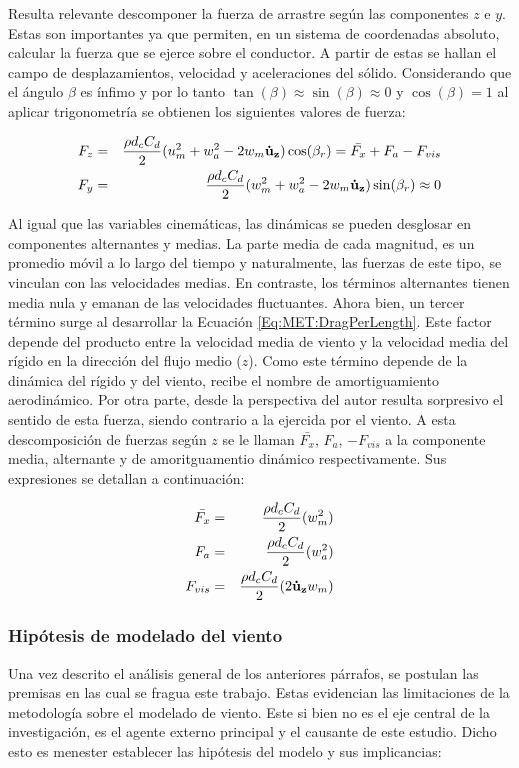 Resulta relevante descomponer la fuerza de arrastre según las componentes $z$ e $y$. Estas son importantes ya que permiten, en un sistema de coordenadas absoluto, calcular la fuerza que se ejerce sobre el conductor. A partir de estas se hallan el campo de desplazamientos, velocidad y aceleraciones del sólido. Considerando que el ángulo $\beta$ es ínfimo y por lo tanto $\tan(\beta)\approx\sin(\beta)\approx 0$ y $\cos(\beta)=1$ al aplicar trigonometría se obtienen los siguientes valores de fuerza:

\begin{eqnarray}
	F_z &=& \frac{\rho d_c C_d}{2} (u_m^2+w_a^2-2 w_m \text{$\bf{\dot{u}}_{z}$})\cos(\beta_r)=\bar{F_x}+F_a-F_{vis}\\
	F_y &=& \frac{\rho d_c C_d}{2} (w_m^2+w_a^2-2 w_m \text{$\bf{\dot{u}}_{z}$})\sin(\beta_r)\approx 0
\end{eqnarray}

Al igual que las variables cinemáticas, las dinámicas se pueden desglosar en componentes alternantes y medias. La parte media de cada magnitud, es un promedio móvil a lo largo del tiempo y naturalmente, las fuerzas de este tipo, se vinculan con las velocidades medias. En contraste, los términos alternantes tienen media nula y emanan de las velocidades fluctuantes. Ahora bien, un tercer término surge al desarrollar la Ecuación \eqref{Eq:MET:DragPerLength}. Este factor depende del producto entre la velocidad media de viento y la velocidad media del rígido en la dirección del flujo medio ($z$). Como este término depende de la dinámica del rígido y del viento, recibe el nombre de amortiguamiento aerodinámico. Por otra parte, desde la perspectiva del autor resulta sorpresivo el sentido de esta fuerza, siendo contrario a la ejercida por el viento.  A esta descomposición de fuerzas según $z$ se le llaman $\bar{F_x}$, $F_a$, $-F_{vis}$ a la componente media, alternante y de amoritguamentio dinámico respectivamente. Sus expresiones se detallan a continuación: 

\begin{eqnarray}
	\bar{F_x} &=&  \frac{\rho d_c C_d}{2} (w_m^2)\\
	F_a &=&  \frac{\rho d_c C_d}{2} (w_a^2)\\
	\label{Eq:MET:AmortAerodniamic}
	F_{vis}  &=& \frac{\rho d_c C_d}{2} (2 \text{$\bf{\dot{u}}_{z}$} w_m)
\end{eqnarray}  


\subsubsection{Hipótesis de modelado del viento} \label{Sec:MET:HipotesisdeTrabajo}
Una vez descrito el análisis general de los anteriores párrafos, se postulan las premisas en las cual se fragua este trabajo. Estas evidencian las limitaciones de la metodología sobre el modelado de viento. Este si bien no es el eje central de la investigación, es el agente externo principal y el causante de este estudio. Dicho esto es menester establecer las hipótesis del modelo y sus implicancias:

